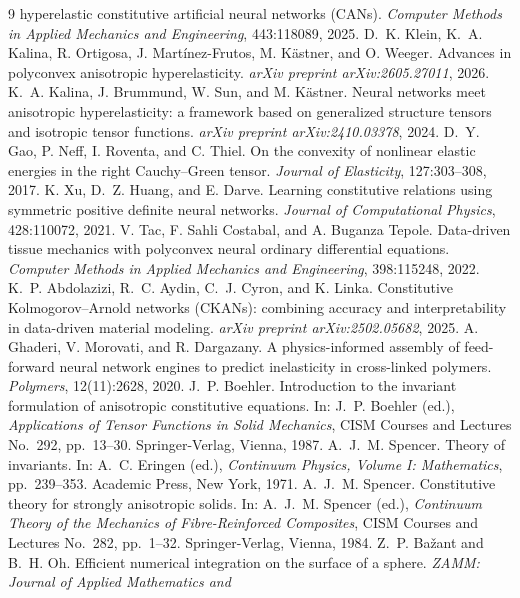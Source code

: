 \documentclass[10pt,a4paper]{article}
\begin{document}
\begin{thebibliography}{9}
hyperelastic constitutive artificial neural networks (CANs).
\emph{Computer Methods in Applied Mechanics and Engineering}, 443:118089,
2025.
D.~K. Klein, K.~A. Kalina, R. Ortigosa, J. Mart\'inez-Frutos, M. K\"astner,
and O. Weeger. Advances in polyconvex anisotropic hyperelasticity.
\emph{arXiv preprint arXiv:2605.27011}, 2026.
K.~A. Kalina, J. Brummund, W. Sun, and M. K\"astner. Neural networks meet
anisotropic hyperelasticity: a framework based on generalized structure
tensors and isotropic tensor functions.
\emph{arXiv preprint arXiv:2410.03378}, 2024.
D.~Y. Gao, P. Neff, I. Roventa, and C. Thiel. On the convexity of
nonlinear elastic energies in the right Cauchy--Green tensor.
\emph{Journal of Elasticity}, 127:303--308, 2017.
K. Xu, D.~Z. Huang, and E. Darve. Learning constitutive relations using
symmetric positive definite neural networks.
\emph{Journal of Computational Physics}, 428:110072, 2021.
V. Tac, F. Sahli Costabal, and A. Buganza Tepole. Data-driven tissue
mechanics with polyconvex neural ordinary differential equations.
\emph{Computer Methods in Applied Mechanics and Engineering}, 398:115248,
2022.
K.~P. Abdolazizi, R.~C. Aydin, C.~J. Cyron, and K. Linka. Constitutive
Kolmogorov--Arnold networks (CKANs): combining accuracy and
interpretability in data-driven material modeling.
\emph{arXiv preprint arXiv:2502.05682}, 2025.
A. Ghaderi, V. Morovati, and R. Dargazany. A physics-informed assembly of
feed-forward neural network engines to predict inelasticity in
cross-linked polymers. \emph{Polymers}, 12(11):2628, 2020.
J.~P. Boehler. Introduction to the invariant formulation of anisotropic
constitutive equations. In: J.~P. Boehler (ed.), \emph{Applications of
Tensor Functions in Solid Mechanics}, CISM Courses and Lectures No.~292,
pp.~13--30. Springer-Verlag, Vienna, 1987.
A.~J.~M. Spencer. Theory of invariants. In: A.~C. Eringen (ed.),
\emph{Continuum Physics, Volume I: Mathematics}, pp.~239--353. Academic
Press, New York, 1971.
A.~J.~M. Spencer. Constitutive theory for strongly anisotropic solids.
In: A.~J.~M. Spencer (ed.), \emph{Continuum Theory of the Mechanics of
Fibre-Reinforced Composites}, CISM Courses and Lectures No.~282,
pp.~1--32. Springer-Verlag, Vienna, 1984.
Z.~P. Ba\v{z}ant and B.~H. Oh. Efficient numerical integration on the
surface of a sphere. \emph{ZAMM: Journal of Applied Mathematics and
}
\end{thebibliography}
\end{document}
